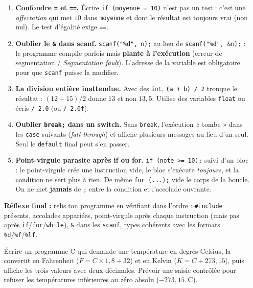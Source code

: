 \documentclass[11pt]{article}
\begin{document}
\begin{attention}
\begin{enumerate}
\item \textbf{Confondre \texttt{=} et \texttt{==}.} Écrire \texttt{if (moyenne = 10)} n'est pas un test : c'est une \emph{affectation} qui met $10$ dans \texttt{moyenne} et dont le résultat est toujours vrai (non nul). Le test d'égalité exige \texttt{==}.
\item \textbf{Oublier le \texttt{\&} dans scanf.} \texttt{scanf("\%d", n);} au lieu de \texttt{scanf("\%d", \&n);} : le programme compile parfois mais \textbf{plante à l'exécution} (erreur de segmentation / \emph{Segmentation fault}). L'adresse de la variable est obligatoire pour que \texttt{scanf} puisse la modifier.
\item \textbf{La division entière inattendue.} Avec des \texttt{int}, \texttt{(a + b) / 2} tronque le résultat : $(12 + 15)/2$ donne $13$ et non $13{,}5$. Utilise des variables \texttt{float} ou écris \texttt{/ 2.0} (ou \texttt{/ 2.0f}).
\item \textbf{Oublier \texttt{break;} dans un switch.} Sans \texttt{break}, l'exécution « tombe » dans les \texttt{case} suivants (\emph{fall-through}) et affiche plusieurs messages au lieu d'un seul. Seul le \texttt{default} final peut s'en passer.
\item \textbf{Point-virgule parasite après if ou for.} \texttt{if (note >= 10);} suivi d'un bloc : le point-virgule crée une instruction vide, le bloc s'exécute \emph{toujours}, et la condition ne sert plus à rien. De même \texttt{for (...);} vide le corps de la boucle. On ne met \textbf{jamais} de \texttt{;} entre la condition et l'accolade ouvrante.
\end{enumerate}
\textbf{Réflexe final :} relis ton programme en vérifiant dans l'ordre : \texttt{\#include} présents, accolades appariées, point-virgule après chaque instruction (mais pas après \texttt{if}/\texttt{for}/\texttt{while}), \texttt{\&} dans les \texttt{scanf}, types cohérents avec les formats \texttt{\%d}/\texttt{\%f}/\texttt{\%lf}.
\end{attention}

\begin{exercice}
Écrire un programme C qui demande une température en degrés Celsius, la convertit en Fahrenheit ($F = C \times 1,8 + 32$) et en Kelvin ($K = C + 273,15$), puis affiche les trois valeurs avec deux décimales. Prévoir une saisie contrôlée pour refuser les températures inférieures au zéro absolu ($-273,15\,^\circ\text{C}$).
\end{exercice}
\end{document}
